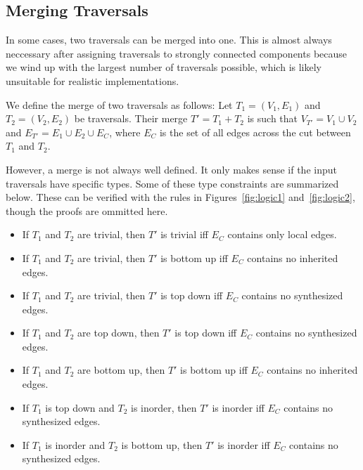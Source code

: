 \documentclass[10pt]{article}
\begin{document}
\subsection{Merging Traversals}
In some cases, two traversals can be merged into one. This is almost always neccessary after assigning traversals to strongly connected components because we wind up with the largest number of traversals possible, which is likely unsuitable for realistic implementations.

We define the merge of two traversals as follows: Let $T_1 = (V_1, E_1)$ and $T_2 = (V_2, E_2)$ be traversals. Their merge $T' = T_1 + T_2$ is such that $V_{T'} = V_1 \cup V_2$ and $E_{T'} = E_1 \cup E_2 \cup E_C$, where $E_C$ is the set of all edges across the cut between $T_1$ and $T_2$.

However, a merge is not always well defined. It only makes sense if the input traversals have specific types. Some of these type constraints are summarized below. These can be verified with the rules in Figures~\ref{fig:logic1} and~\ref{fig:logic2}, though the proofs are ommitted here.
\begin{itemize}
    \item If $T_1$ and $T_2$ are trivial, then $T'$ is trivial iff $E_C$ contains only local edges.
    \item If $T_1$ and $T_2$ are trivial, then $T'$ is bottom up iff $E_C$ contains no inherited edges.
    \item If $T_1$ and $T_2$ are trivial, then $T'$ is top down iff $E_C$ contains no synthesized edges.
    \item If $T_1$ and $T_2$ are top down, then $T'$ is top down iff $E_C$ contains no synthesized edges.
    \item If $T_1$ and $T_2$ are bottom up, then $T'$ is bottom up iff $E_C$ contains no inherited edges.
    \item If $T_1$ is top down and $T_2$ is inorder, then $T'$ is inorder iff $E_C$ contains no synthesized edges.
    \item If $T_1$ is inorder and $T_2$ is bottom up, then $T'$ is inorder iff $E_C$ contains no synthesized edges.

\end{itemize}
\end{document}

